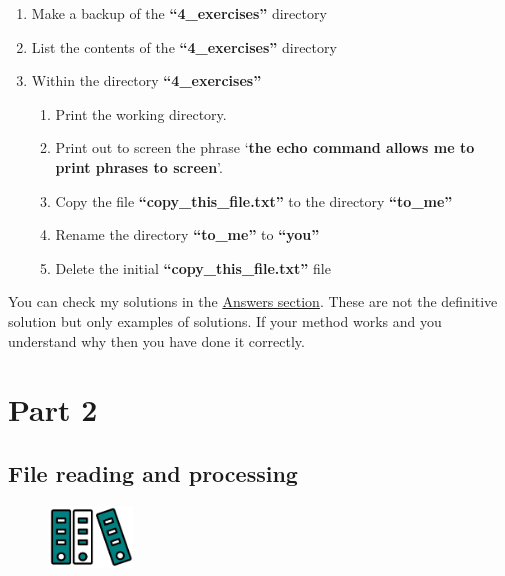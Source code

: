 \documentclass[
  letterpaper,
  DIV=11,
  numbers=noendperiod]{scrreprt}
\providecommand{\tightlist}{%
  \setlength{\itemsep}{0pt}\setlength{\parskip}{0pt}}\usepackage{longtable,booktabs,array}
\begin{document}
\begin{enumerate}
\def\labelenumi{\arabic{enumi}.}
\tightlist
\item
  Make a backup of the \textbf{``4\_exercises''} directory
\item
  List the contents of the \textbf{``4\_exercises''} directory
\item
  Within the directory \textbf{``4\_exercises''}

  \begin{enumerate}
  \def\labelenumii{\arabic{enumii}.}
  \tightlist
  \item
    Print the working directory.
  \item
    Print out to screen the phrase `\textbf{the echo command allows me
    to print phrases to screen}'.
  \item
    Copy the file \textbf{``copy\_this\_file.txt''} to the directory
    \textbf{``to\_me''}
  \item
    Rename the directory \textbf{``to\_me''} to \textbf{``you''}
  \item
    Delete the initial \textbf{``copy\_this\_file.txt''} file
  \end{enumerate}
\end{enumerate}

You can check my solutions in the
\protect\hyperlink{exercise1_answers}{Answers section}. These are not
the definitive solution but only examples of solutions. If your method
works and you understand why then you have done it correctly.

\part{Part 2}

\hypertarget{filereadingandprocessing}{%
\chapter{File reading and processing}\label{filereadingandprocessing}}

\begin{figure}

{\centering \includegraphics[width=0.2\textwidth,height=\textheight]{figures/files.png}

}

\end{figure}
\end{document}
